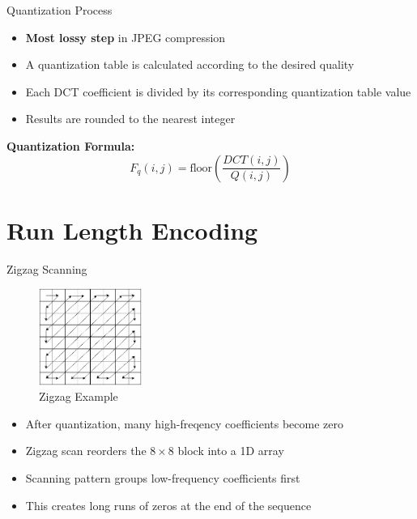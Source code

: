 \documentclass[10pt]{beamer}
\begin{document}
\begin{frame}{Quantization Process}
    \begin{itemize}
     \item \textbf{Most lossy step} in JPEG compression
     \item A quantization table is calculated according to the desired quality
     \item Each DCT coefficient is divided by its corresponding quantization table value
     \item Results are rounded to the nearest integer
    \end{itemize}

    \vspace{0.5cm}
    \textbf{Quantization Formula:}
    $$F_q(i,j) = \text{floor}\left(\frac{DCT(i,j)}{Q(i,j)}\right)$$
\end{frame}


\section{Run Length Encoding}

\begin{frame}{Zigzag Scanning}

    \begin{figure}[h]
        \centering
        \includegraphics[width=0.3\textwidth]{zigzag.png}
        \caption{Zigzag Example}
    \end{figure}

    \begin{itemize}
     \item After quantization, many high-freqency coefficients become zero
     \item Zigzag scan reorders the $8\times8$ block into a 1D array
     \item Scanning pattern groups low-frequency coefficients first
     \item This creates long runs of zeros at the end of the sequence
    \end{itemize}
\end{frame}
\end{document}
